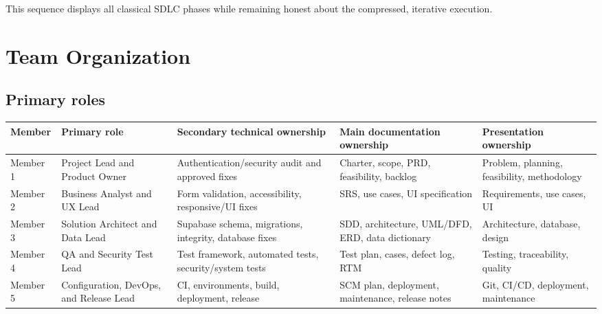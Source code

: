 \documentclass[
  10pt,
  a4paper,
  oneside]{report}
\newcounter{none} %
\begin{document}
This sequence displays all classical SDLC phases while remaining honest
about the compressed, iterative execution.

\chapter{Team Organization}\label{7-team-organization}

\section{Primary roles}\label{71-primary-roles}

{\def\LTcaptype{none} %
\begin{longtable}[]{@{}
  >{\raggedright\arraybackslash}p{}
  >{\raggedright\arraybackslash}p{}
  >{\raggedright\arraybackslash}p{}
  >{\raggedright\arraybackslash}p{}
  >{\raggedright\arraybackslash}p{}@{}}
\toprule\noalign{}
\begin{minipage}[b]{\linewidth}\raggedright
Member
\end{minipage} & \begin{minipage}[b]{\linewidth}\raggedright
Primary role
\end{minipage} & \begin{minipage}[b]{\linewidth}\raggedright
Secondary technical ownership
\end{minipage} & \begin{minipage}[b]{\linewidth}\raggedright
Main documentation ownership
\end{minipage} & \begin{minipage}[b]{\linewidth}\raggedright
Presentation ownership
\end{minipage} \\
\midrule\noalign{}
\endhead
\bottomrule\noalign{}
\endlastfoot
Member 1 & Project Lead and Product Owner & Authentication/security
audit and approved fixes & Charter, scope, PRD, feasibility, backlog &
Problem, planning, feasibility, methodology \\
Member 2 & Business Analyst and UX Lead & Form validation,
accessibility, responsive/UI fixes & SRS, use cases, UI specification &
Requirements, use cases, UI \\
Member 3 & Solution Architect and Data Lead & Supabase schema,
migrations, integrity, database fixes & SDD, architecture, UML/DFD, ERD,
data dictionary & Architecture, database, design \\
Member 4 & QA and Security Test Lead & Test framework, automated tests,
security/system tests & Test plan, cases, defect log, RTM & Testing,
traceability, quality \\
Member 5 & Configuration, DevOps, and Release Lead & CI, environments,
build, deployment, release & SCM plan, deployment, maintenance, release
notes & Git, CI/CD, deployment, maintenance \\
\end{longtable}
}
\end{document}

